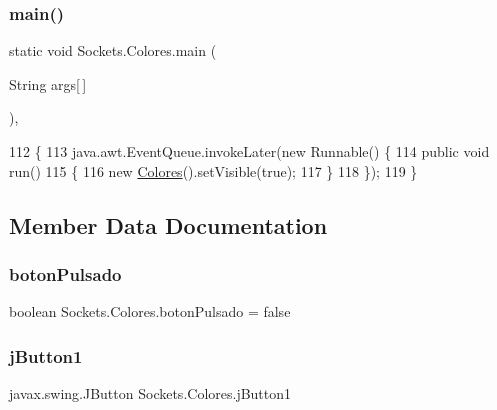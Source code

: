\subsubsection{\texorpdfstring{main()}{main()}}
{\footnotesize\ttfamily static void Sockets.\+Colores.\+main (\begin{DoxyParamCaption}\item[{String}]{args\mbox{[}$\,$\mbox{]} }\end{DoxyParamCaption})\hspace{0.3cm}{\ttfamily [inline]}, {\ttfamily [static]}}


\begin{DoxyCode}
112     \{
113         java.awt.EventQueue.invokeLater(\textcolor{keyword}{new} Runnable() \{
114             \textcolor{keyword}{public} \textcolor{keywordtype}{void} run()
115             \{
116                 \textcolor{keyword}{new} \mbox{\hyperlink{class_sockets_1_1_colores_a1d4e4f3b911aef7557c9dacd277afd67}{Colores}}().setVisible(\textcolor{keyword}{true});
117             \}
118         \});
119     \}
\end{DoxyCode}


\subsection{Member Data Documentation}
\mbox{\label{class_sockets_1_1_colores_ab9176a60b5bc0b70d94a23d9c1a448cd}} 
\subsubsection{\texorpdfstring{boton\+Pulsado}{botonPulsado}}
{\footnotesize\ttfamily boolean Sockets.\+Colores.\+boton\+Pulsado = false\hspace{0.3cm}{\ttfamily [private]}}

\mbox{\label{class_sockets_1_1_colores_ab40711ac8b3b4ea81488754689d89db6}} 
\subsubsection{\texorpdfstring{j\+Button1}{jButton1}}
{\footnotesize\ttfamily javax.\+swing.\+J\+Button Sockets.\+Colores.\+j\+Button1\hspace{0.3cm}{\ttfamily [private]}}

